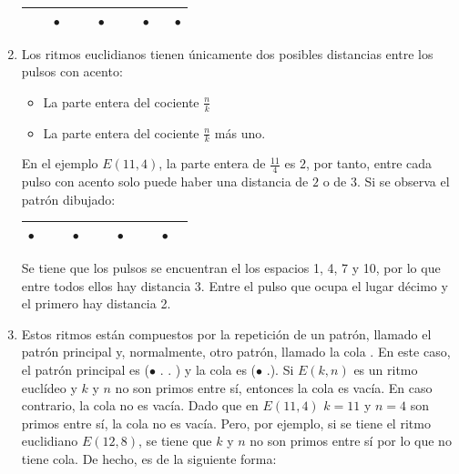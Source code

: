 \documentclass[a4paper, openright, 11pt, titlepage]{report}
\theoremstyle{definition}\newtheorem{defin}[propo]{Definition}
\theoremstyle{definition}\newtheorem{obser}[propo]{Remark}
\theoremstyle{definition}\newtheorem{ejem}[propo]{Ejemplo}
\theoremstyle{definition}\newtheorem{algoritmo}[propo]{Algoritmo}
\begin{document}
\begin{enumerate}
    \begin{table}[H]
        \centering
        \begin{tabular}{|c|c|c|c|c|c|c|c|c|c|c|}
        \hline
            & & $\bullet$ & & & $\bullet$ & & &$\bullet$ & &$\bullet$ \\
            \hline
        \end{tabular}
        \end{table}
    \item Los ritmos euclidianos tienen únicamente dos posibles distancias entre los pulsos con acento:
    \begin{itemize}
        \item La parte entera del cociente $\frac{n}{k}$
        \item La parte entera del cociente $\frac{n}{k}$ más uno.
    \end{itemize}
    En el ejemplo $E(11,4)$, la parte entera de $\frac{11}{4}$ es $2$, por tanto, entre cada pulso con acento solo puede haber una distancia de $2$ o de $3$. Si se observa el patrón dibujado:
    \begin{table}[H]
        \centering
        \begin{tabular}{|c|c|c|c|c|c|c|c|c|c|c|}
        \hline
            $\bullet$ & & & $\bullet$ & & & $\bullet$ & & &$\bullet$ &\\
            \hline
        \end{tabular}
    \end{table}
    Se tiene que los pulsos se encuentran el los espacios 1, 4, 7 y 10, por lo que entre todos ellos hay distancia 3. Entre el pulso que ocupa el lugar décimo y el primero hay distancia 2.
    \item Estos ritmos están compuestos por la repetición de un patrón, llamado el patrón principal y, normalmente, otro patrón, llamado la cola \cite{ritmos}. En este caso, el patrón principal es ($\bullet$\hspace{0.1cm} .\hspace{0.1cm} . \hspace{0.1cm}) y la cola es ($\bullet$ \hspace{0.1cm}.\hspace{0.1cm}). Si $E(k, n)$ es un ritmo euclídeo y $k$ y $n$ no son primos entre sí, entonces la cola es vacía. En caso contrario, la cola no es vacía. Dado que en $E(11,4)$ $k = 11$ y $n = 4$ son primos entre sí, la cola no es vacía. Pero, por ejemplo, si se tiene el ritmo euclidiano $E(12,8)$, se tiene que $k$ y $n$ no son primos entre sí por lo que no tiene cola. De hecho, es de la siguiente forma:

\end{enumerate}
\end{document}
